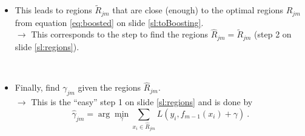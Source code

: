 \documentclass[
  10pt,
  ignorenonframetext,
]{beamer}
\providecommand{\tightlist}{%
  \setlength{\itemsep}{0pt}\setlength{\parskip}{0pt}}
\begin{document}
\begin{frame}
\vspace{2mm}

\begin{itemize}
\tightlist
\item
  This leads to regions \(\tilde{R}_{jm}\) that are close (enough) to
  the optimal regions \(R_{jm}\) from equation \eqref{eq:boosted} on
  slide \eqref{sl:toBoosting}.\\
  \vspace{2mm} \(\rightarrow\) This corresponds to the step to find the
  regions \(\hat{R}_{jm}=\tilde{R}_{jm}\) (step 2 on slide
  \ref{sl:regions}).
\end{itemize}

\(~\)

\begin{itemize}
\tightlist
\item
  Finally, find \(\gamma_{jm}\) given the regions \(\hat{R}_{jm}\).\\
  \vspace{2mm} \(\rightarrow\) This is the ``easy'' step 1 on slide
  \ref{sl:regions} and is done by \begin{equation*}
  \hat\gamma_{jm} = \arg \min_{\gamma} \sum_{x_i \in \hat{R}_{jm}} L(y_i, f_{m-1}(x_i) + \gamma) \ .
  \end{equation*}
\end{itemize}
\end{frame}
\end{document}
